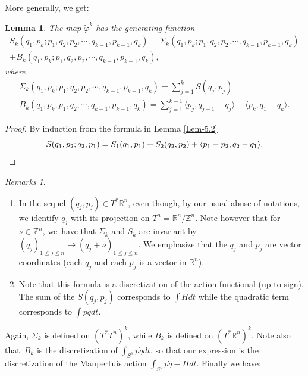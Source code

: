 \documentclass[JEP,XML,SOM,NoFloatCountersInSection,Unicode,published]{cedram}
\numberwithin{equation}{section}
\theoremstyle{plain}
\newtheorem{lemma}[theorem]{Lemma}
\theoremstyle{definition}
\theoremstyle{remark}
\newtheorem{remarks}[theorem]{Remarks}
\begin{document}
More generally, we get:
\begin{lemma}\label{4.3}
The map $\widetilde{\varphi}^{k}$ has the generating function
\begin{multline*}
{S}_{k}(q_{1}, p_{k} ; p_{1}, q_{2},p_{2},\cdots, q_{k-1}, p_{k-1},q_{k}) =
{\Sigma}_{k} (q_{1}, p_{k} ; p_{1}, q_{2}, p_{2},\cdots,
q_{k-1}, p_{k-1}, q_{k})\\
+ B_{k} (q_{1}, p_{k} ; p_{1}, q_{2},p_{2},\cdots, q_{k-1}, p_{k-1}, q_{k}),
\end{multline*}
where
\begin{gather*}
{\Sigma}_{k} (q_{1}, p_{k} ; p_{1},q_{2},p_{2}, \cdots,
q_{k-1}, p_{k-1}, q_{k}) =
\sum_{j=1}^{k} {S}(q_{j}, p_{j})
\\
\tag*{and}
B_{k} (q_{1}, p_{k}; p_{1}, q_{2},\cdots, q_{k-1}, p_{k-1},
q_{k}) =
\sum_{j=1}^{k-1} \langle p_{j}, q_{j+1}-q_{j} \rangle + \langle p_k, q_1-q_k\rangle.
\end{gather*}
\end{lemma}

\begin{proof} By induction from the formula in Lemma \ref{Lem-5.2}
\[
{S}(q_{1}, p_{2} ; q_{2},p_{1}) ={S}_{1} (q_{1},p_{1}) + {S}_{2} (q_{2},p_{2}) + \langle p_{1} - p_{2}, q_{2} - q_{1} \rangle.\qedhere
\]
\end{proof}

\skpt
\begin{remarks}
\begin{enumerate}
\item In the sequel $(q_{j},p_{j})\in T^* {\mathbb R} ^n$, even though, by our usual abuse of notations, we identify $q_{j}$ with its projection on $T^n= {\mathbb R} ^n/ {\mathbb Z}^n$.
Note however that for $\nu \in {\mathbb Z}^n$, we~have that $\Sigma_{k}$ and $S_k$ are invariant by
$(q_{j})_{1\leq j \leq n} \to (q_{j}+ \nu)_{1\leq j \leq n}$. We emphasize that the $q_j$ and $p_j$ are vector coordinates (\ie each $q_j$ and each $p_j$ is a vector in $ {\mathbb R}^n$).
\item Note that this formula is a discretization of the action functional (up to sign). The sum of the $S(q_j,p_j)$ corresponds to $\int Hdt$ while the quadratic term corresponds to $\int p\dot q dt$.
\end{enumerate}
\end{remarks}
Again, ${\Sigma}_{k}$ is defined on
$(T^{*}T^{n})^{k}$, while ${B}_{k}$ is defined on
$(T^{*}\mathbb{R}^{n})^{k}$. Note also that~$B_k$ is the discretization of $\int_{S^1}p\dot q dt$, so that our expression is the discretization of the Maupertuis action $\int_{S^1}p\dot q - H dt$. Finally we have:
\end{document}
